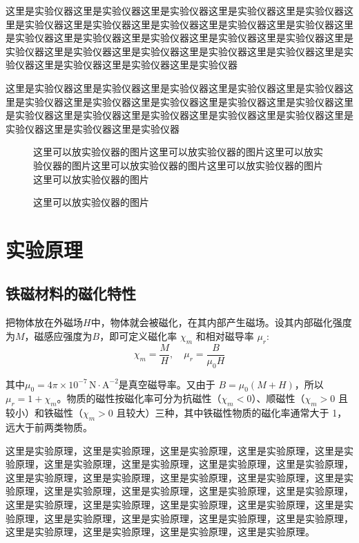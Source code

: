 \documentclass[UTF8]{article}
\theoremstyle{MyLineTheoremStyle} %
\theoremstyle{MyBlockTheoremStyle} %
\theoremstyle{MySubsubsectionStyle} %
\begin{document}
这里是实验仪器这里是实验仪器这里是实验仪器这里是实验仪器这里是实验仪器这里是实验仪器这里是实验仪器这里是实验仪器这里是实验仪器这里是实验仪器这里是实验仪器这里是实验仪器这里是实验仪器这里是实验仪器这里是实验仪器这里是实验仪器这里是实验仪器这里是实验仪器这里是实验仪器这里是实验仪器这里是实验仪器这里是实验仪器这里是实验仪器这里是实验仪器

这里是实验仪器这里是实验仪器这里是实验仪器这里是实验仪器这里是实验仪器这里是实验仪器这里是实验仪器这里是实验仪器这里是实验仪器这里是实验仪器这里是实验仪器这里是实验仪器这里是实验仪器这里是实验仪器这里是实验仪器这里是实验仪器这里是实验仪器这里是实验仪器

\begin{figure}[H]\centering
    这里可以放实验仪器的图片这里可以放实验仪器的图片这里可以放实验仪器的图片这里可以放实验仪器的图片这里可以放实验仪器的图片这里可以放实验仪器的图片
\caption{这里可以放实验仪器的图片}\label{示例图片}
\end{figure}

\section{实验原理}
\subsection{铁磁材料的磁化特性}
把物体放在外磁场$ H $中，物体就会被磁化，在其内部产生磁场。设其内部磁化强度为$ M $，磁感应强度为$ B $，即可定义磁化率 $ \chi_m $ 和相对磁导率 $ \mu_r $: 
\begin{equation}
    \chi_m=\frac MH,\quad \mu_r=\frac{B}{\mu_0 H}
\end{equation}

其中$ \mu_0=4\pi\times10^{-7}\,\mathrm{N\cdot A^{-2}} $是真空磁导率。又由于 $ B=\mu_0(M+H) $，所以 $ \mu_r=1+\chi_m $。物质的磁性按磁化率可分为抗磁性（$\chi_m < 0$）、顺磁性（$\chi_m > 0$ 且较小）和铁磁性（$\chi_m >0$ 且较大）三种，其中铁磁性物质的磁化率通常大于 1，远大于前两类物质。

这里是实验原理，这里是实验原理，这里是实验原理，这里是实验原理，这里是实验原理，这里是实验原理，这里是实验原理，这里是实验原理，这里是实验原理，这里是实验原理，这里是实验原理，这里是实验原理，这里是实验原理，这里是实验原理，这里是实验原理，这里是实验原理，这里是实验原理，这里是实验原理，这里是实验原理，这里是实验原理，这里是实验原理，这里是实验原理，这里是实验原理，这里是实验原理，这里是实验原理，这里是实验原理，这里是实验原理，这里是实验原理，这里是实验原理，这里是实验原理，这里是实验原理。
\end{document}
